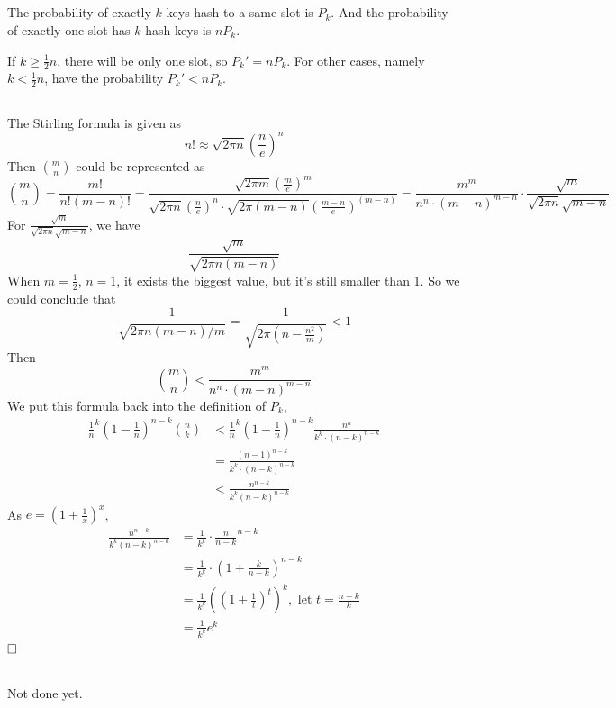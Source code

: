 \documentclass[A4paper]{article}
\newcommand{\qedhere}{$\hfill\ensuremath{\square}$}
\begin{document}
\subsection{}
The probability of exactly $k$ keys hash to a same slot is $P_k$. And the probability of exactly one slot has $k$ hash keys is $nP_k$. 
\par If $k \geq \frac{1}{2}n$, there will be only one slot, so $P_k' = nP_k$. For other cases, namely $k < \frac{1}{2}n$, have the probability $P_k'< nP_k$.
\subsection{}
The Stirling formula is given as 
\[
	n! \approx \sqrt{2 \pi n} \left(\frac{n}{e}\right)^n
\] 
Then $ \binom{m}{n}$ could be represented as
\[
	\binom{m}{n} = \frac{m!}{n!(m-n)!} = \frac{\sqrt{2 \pi m} \left(\frac{m}{e}\right)^m}{\sqrt{2 \pi n} \left(\frac{n}{e}\right)^n \cdot \sqrt{2 \pi (m-n)} \left(\frac{m-n}{e}\right)^{(m-n)}} = \frac{m^m}{n^n\cdot (m-n)^{m-n}}\cdot \frac{\sqrt{m}}{\sqrt{2 \pi n} \sqrt{m-n}}
\]
For $\frac{\sqrt{m}}{\sqrt{2 \pi n} \sqrt{m-n}}$, we have 
\[
	\frac{\sqrt{m}}{\sqrt{2 \pi n(m-n)}}
\]	
When $m= \frac{1}{2}$, $n=1$, it exists the biggest value, but it's still smaller than 1. So we could conclude that 
\[
	\frac{1}{\sqrt{2 \pi n(m-n)/m}} = \frac{1}{\sqrt{2 \pi (n- \frac{n^2}{m})}} <1
\]
Then \[
	\binom{m}{n} < \frac{m^m}{n^n\cdot (m-n)^{m-n}}
\]
We put this formula back into the definition of $P_k$, 
\[
\begin{aligned}
	\frac{1}{n}^k \left(1- \frac{1}{n} \right)^{n-k} \binom{n}{k} &< \frac{1}{n}^k \left(1- \frac{1}{n} \right)^{n-k} \frac{n^n}{k^k\cdot (n-k)^{n-k}}\\
	& = \frac{(n-1)^{n-k}}{k^k\cdot (n-k)^{n-k}}\\
	&< \frac{n^{n-k}}{k^k(n-k)^{n-k}}
\end{aligned}
\]
As $e = (1+\frac{1}{x})^x$, 
\[
	\begin{aligned}
	\frac{n^{n-k}}{k^k(n-k)^{n-k}} &= \frac{1}{k^k} \cdot \frac{n}{n-k}^{n-k} \\
	&=\frac{1}{k^k} \cdot \left(1+\frac{k}{n-k} \right)^{n-k} \\
	&= \frac{1}{k^k} ((1+\frac{1}{t})^t)^k, \text{\ \ \ let $t = \frac{n-k}{k}$} \\
	&= \frac{1}{k^k} e^k
	\end{aligned}
\]
\qedhere
\subsection{}
Not done yet.
\end{document}
